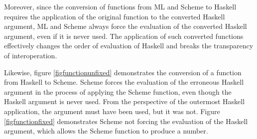 Moreover, since the conversion of functions from ML and Scheme to Haskell requires the application of the original function to the converted Haskell argument, ML and Scheme always force the evaluation of the converted Haskell argument, even if it is never used. The application of such converted functions effectively changes the order of evaluation of Haskell and breaks the transparency of interoperation.

Likewise, figure \ref{figfunctionunfixed} demonstrates the conversion of a function from Haskell to Scheme. Scheme forces the evaluation of the erroneous Haskell argument in the process of applying the Scheme function, even though the Haskell argument is never used. From the perspective of the outermost Haskell application, the argument must have been used, but it was not. Figure \ref{figfunctionfixed} demonstrates Scheme not forcing the evaluation of the Haskell argument, which allows the Scheme function to produce a number.

\clearpage







